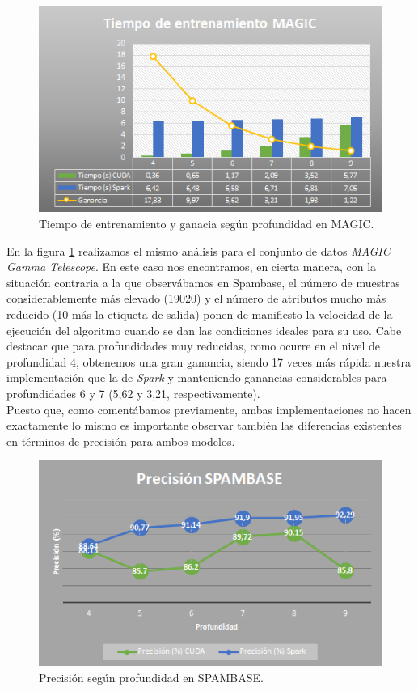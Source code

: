 \begin{figure}[ht]
\centering
\includegraphics[scale=1.0]{imagenes/magic_times.png}
\caption{Tiempo de entrenamiento y ganacia según profundidad en MAGIC.}
\label{img:magictimes}
\end{figure}

En la figura \ref{img:magictimes} realizamos el mismo análisis para el conjunto de datos \textit{MAGIC Gamma Telescope}. En este caso nos encontramos, en cierta manera, con la situación contraria a la que observábamos en Spambase, el número de muestras considerablemente más elevado (19020) y el número de atributos mucho más reducido (10 más la etiqueta de salida) ponen de manifiesto la velocidad de la ejecución del algoritmo cuando se dan las condiciones ideales para su uso. Cabe destacar que para profundidades muy reducidas, como ocurre en el nivel de profundidad 4, obtenemos una gran ganancia, siendo 17 veces más rápida nuestra implementación que la de \textit{Spark} y manteniendo ganancias considerables para profundidades 6 y 7 (5,62 y 3,21, respectivamente). \\

Puesto que, como comentábamos previamente, ambas implementaciones no hacen exactamente lo mismo es importante observar también las diferencias existentes en términos de precisión para ambos modelos.\\

\begin{figure}[ht]
\centering
\includegraphics[scale=1.0]{imagenes/spambase_prec.png}
\caption{Precisión según profundidad en SPAMBASE.}
\label{img:spambaseprec}
\end{figure}

